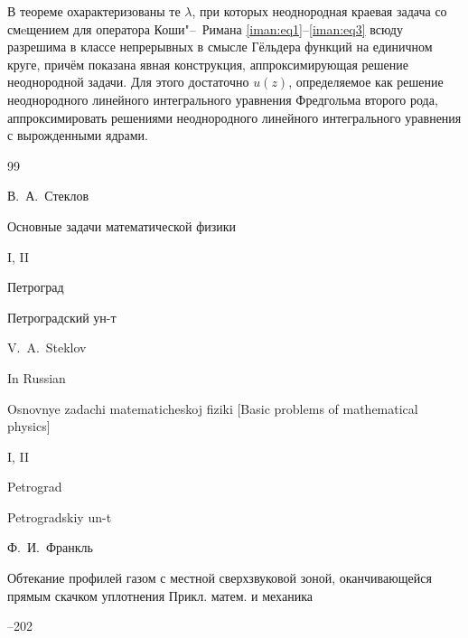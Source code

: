 \smallskip

В теореме  охарактеризованы те $\lambda $,  при которых неоднородная краевая задача со смeщением  для оператора Коши"--~Римана \eqref{iman:eq1}--\eqref{iman:eq3} всюду разрешима в классе непрерывных в смысле Гёльдера функций на единичном круге, причём показана явная конструкция, аппроксимирующая решение неоднородной задачи. Для этого достаточно $u(z)$, определяемое как решение неоднородного линейного интегрального уравнения Фредгольма второго рода, аппроксимировать решениями неоднородного линейного интегрального уравнения с вырожденными ядрами.



\pagebreak



\begin{thebibliography}{99}




\by В.~А.~Стеклов 

\book Основные задачи математической физики

\bookvol I, II

\publaddr Петроград

\publ Петроградский ун-т



\misctransl

\by V.~A.~Steklov

\lang In Russian 

\book Osnovnye zadachi matematicheskoj fiziki \rm [Basic problems of mathematical physics]

\bookvol I, II

\publaddr Petrograd

\publ Petrogradskiy un-t





\by Ф.~И.~Франкль  

\paper Обтекание профилей газом с местной сверхзвуковой зоной, оканчивающейся прямым скачком уплотнения \jour Прикл. матем. и механика




--202



\end{thebibliography}
